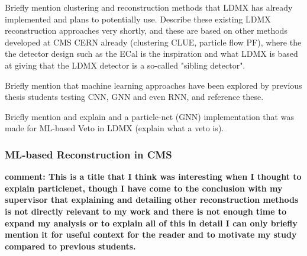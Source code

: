 Briefly mention clustering and reconstruction methods that LDMX has already implemented and plans to potentially use. Describe these existing LDMX reconstruction approaches very shortly, and these are based on other methods developed at CMS CERN already (clustering CLUE, particle flow PF), where the the detector design such as the ECal is the inspiration and what LDMX is based at giving that the LDMX detector is a so-called "sibling detector".

Briefly mention that machine learning approaches have been explored by previous thesis students testing CNN, GNN and even RNN, and reference these.

Briefly mention and explain and a particle-net (GNN) implementation that was made for ML-based Veto in LDMX (explain what a veto is).


\subsubsection{ML-based Reconstruction in CMS}

\textbf{comment: This is a title that I think was interesting when I thought to explain particlenet, though I have come to the conclusion with my supervisor that explaining and detailing other reconstruction methods is not directly relevant to my work and there is not enough time to expand my analysis or to explain all of this in detail I can only briefly mention it for useful context for the reader and to motivate my study compared to previous students.}

